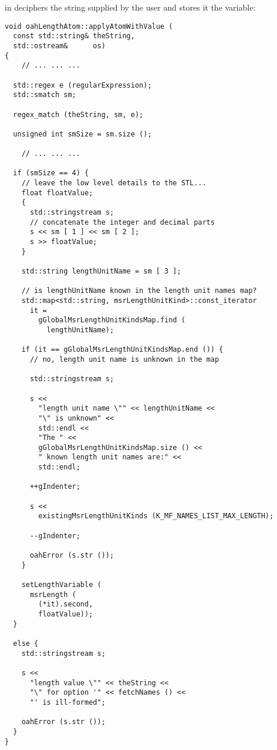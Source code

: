  in  deciphers the string supplied by the user and stores it the  variable:
\begin{lstlisting}[language=CPlusPlus]
void oahLengthAtom::applyAtomWithValue (
  const std::string& theString,
  std::ostream&      os)
{
	// ... ... ...

  std::regex e (regularExpression);
  std::smatch sm;

  regex_match (theString, sm, e);

  unsigned int smSize = sm.size ();

	// ... ... ...

  if (smSize == 4) {
    // leave the low level details to the STL...
    float floatValue;
    {
      std::stringstream s;
      // concatenate the integer and decimal parts
      s << sm [ 1 ] << sm [ 2 ];
      s >> floatValue;
    }

    std::string lengthUnitName = sm [ 3 ];

    // is lengthUnitName known in the length unit names map?
    std::map<std::string, msrLengthUnitKind>::const_iterator
      it =
        gGlobalMsrLengthUnitKindsMap.find (
          lengthUnitName);

    if (it == gGlobalMsrLengthUnitKindsMap.end ()) {
      // no, length unit name is unknown in the map

      std::stringstream s;

      s <<
        "length unit name \"" << lengthUnitName <<
        "\" is unknown" <<
        std::endl <<
        "The " <<
        gGlobalMsrLengthUnitKindsMap.size () <<
        " known length unit names are:" <<
        std::endl;

      ++gIndenter;

      s <<
        existingMsrLengthUnitKinds (K_MF_NAMES_LIST_MAX_LENGTH);

      --gIndenter;

      oahError (s.str ());
    }

    setLengthVariable (
      msrLength (
        (*it).second,
        floatValue));
  }

  else {
    std::stringstream s;

    s <<
      "length value \"" << theString <<
      "\" for option '" << fetchNames () <<
      "' is ill-formed";

    oahError (s.str ());
  }
}
\end{lstlisting}

